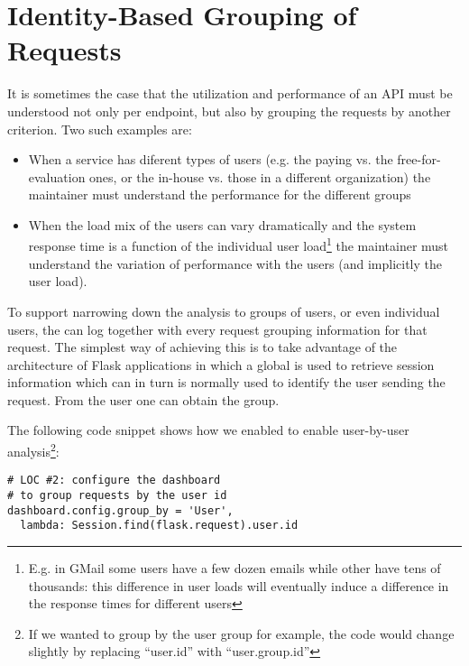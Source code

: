 
\section{Identity-Based Grouping of Requests}
\label{sec:grouping}

It is sometimes the case that the utilization and performance of an API must be understood not only per endpoint, but also by grouping the requests by another criterion. Two such examples are: 
\begin{itemize}
	\item When a service has diferent types of users (e.g. the paying vs. the free-for-evaluation ones, or the in-house vs. those in a different organization) the maintainer must understand the performance for the different groups
	\item When the load mix of the users can vary dramatically and the system response time is a function of the individual user load\footnote{E.g. in GMail some users have a few dozen emails while other have tens of thousands: this difference in user loads will eventually induce a difference in the response times for different users} the maintainer must understand the variation of performance with the users (and implicitly the user load).
\end{itemize}

To support narrowing down the analysis to groups of users, or even individual users, the \tool can log together with every request grouping information for that request. The simplest way of achieving this is to take advantage of the architecture of Flask applications in which a global  is used to retrieve session information which can in turn is normally used to identify the user sending the request. From the user one can obtain the group. 


The following code snippet shows how we enabled \tool to enable user-by-user analysis\footnote{If we wanted to group by the user group for example, the code would change slightly by replacing ``user.id'' with ``user.group.id''}: 

\begin{lstlisting}[style=custompython]  
# LOC #2: configure the dashboard
# to group requests by the user id
dashboard.config.group_by = 'User',
  lambda: Session.find(flask.request).user.id

\end{lstlisting}

